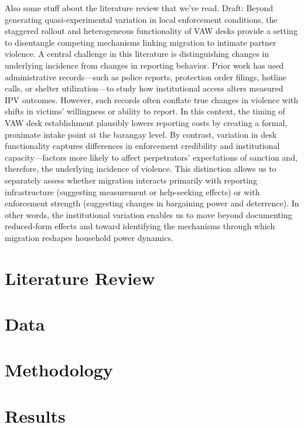 \documentclass[12pt]{article}
\begin{document}
Also some stuff about the literature review that we've read. Draft:
Beyond generating quasi-experimental variation in local enforcement conditions, the staggered rollout and heterogeneous functionality of VAW desks provide a setting to disentangle competing mechanisms linking migration to intimate partner violence. A central challenge in this literature is distinguishing changes in underlying incidence from changes in reporting behavior. Prior work has used administrative records—such as police reports, protection order filings, hotline calls, or shelter utilization—to study how institutional access alters measured IPV outcomes. However, such records often conflate true changes in violence with shifts in victims’ willingness or ability to report.
In this context, the timing of VAW desk establishment plausibly lowers reporting costs by creating a formal, proximate intake point at the barangay level. By contrast, variation in desk functionality captures differences in enforcement credibility and institutional capacity—factors more likely to affect perpetrators’ expectations of sanction and, therefore, the underlying incidence of violence. This distinction allows us to separately assess whether migration interacts primarily with reporting infrastructure (suggesting measurement or help-seeking effects) or with enforcement strength (suggesting changes in bargaining power and deterrence). In other words, the institutional variation enables us to move beyond documenting reduced-form effects and toward identifying the mechanisms through which migration reshapes household power dynamics.


\section{Literature Review}
\label{sec:literature}

\section{Data}
\label{sec:data}

\section{Methodology}
\label{sec:method}

\section{Results}
\label{sec:results}
\end{document}

